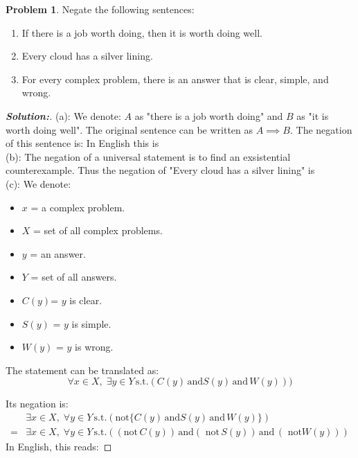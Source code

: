 \documentclass[12pt]{article}
\theoremstyle{definition}\newtheorem{problem}{Problem}
\newenvironment{solution}{\begin{proof}[\bfseries\textup{Solution:}]}{\end{proof}}
\begin{document}
%
\newpage
\begin{problem}
Negate the following sentences:
\begin{enumerate}
\item If there is a job worth doing, then it is worth doing well.
\item Every cloud has a silver lining.
\item For every complex problem, there is an answer that is clear, simple, and wrong.
\end{enumerate}
\end{problem}
\begin{solution}\quad \newline

    (a): We denote: $ A $ as "there is a job worth doing" and $ B $ as "it is worth doing well". The original sentence can be written as $ A \implies B $. The negation of this sentence is:  
    In English this is 
\\

    (b): The negation of a universal statement is to find an exsistential counterexample. Thus the negation of "Every cloud has a silver lining" is \\

    (c): We denote: \begin{itemize}
        \item  $x$ = a complex problem.
        \item $ X $ = set of all complex problems.
        \item $y$ = an answer.
        \item $ Y $ = set of all answers.
        \item $ C(y) $= $ y $ is clear. 
        \item $S(y)$ = $y$ is simple.
        \item $W(y)$ = $y$ is wrong.
    \end{itemize}
    
The statement can be translated as: 
    $$\forall x \in X , \; \exists y \in Y \, \text{s.t.} (C(y) \, \text{and} S(y) \, \text{and} \, W(y)))$$

Its negation is:
\begin{align}
&\exists x \in X , \; \forall y \in Y \, \text{s.t.}  (\text{not}\{ C(y) \, \text{and} S(y) \, \text{and} \, W(y)\}) \\
= & \exists x \in X , \; \forall y \in Y \, \text{s.t.}  ((\text{not}\, C(y)) \, \text{and} (\text{ not}\, S(y)) \, \text{and} \, (\text{ not} W(y)))
\end{align}
 In English, this reads: 
 


\end{solution}
\end{document}
